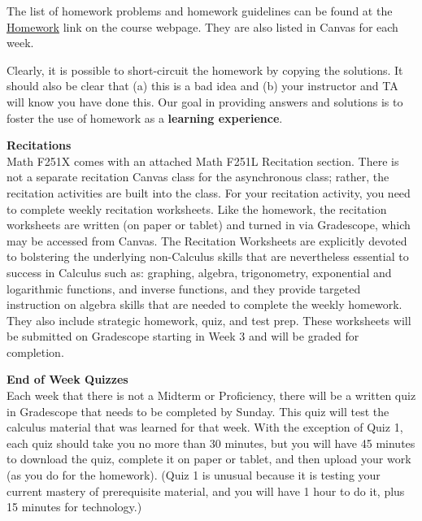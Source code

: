 \documentclass[12pt]{article}
\renewcommand{\emph}[1]{\textsf{\textbf{#1}}}
\newcommand{\localhead}[1]{\par\smallskip\textbf{#1}\nobreak\\}%
\def\heading#1{\localhead{\large\emph{#1}}}
\begin{document}
The list of homework problems and homework guidelines can be found at the \href{https://uaf-math251.github.io/writtenhomework.html}{Homework} link on the course webpage. They are also listed in Canvas for each week.

Clearly, it is possible to short-circuit the homework by copying the solutions. It should also be clear that (a) this is a bad idea and (b) your instructor and TA will know you have done this. Our goal in providing answers and solutions is to foster the use of homework as a \emph{learning experience}. 

\heading{Recitations}
%
Math F251X comes with an attached Math F251L Recitation section. There is not a separate recitation Canvas class for the asynchronous class; rather, the recitation activities are built into the class. For your recitation activity, you need to complete weekly recitation worksheets. Like the homework, the recitation worksheets are written (on paper or tablet) and turned in via Gradescope, which may be accessed from Canvas. The Recitation Worksheets are explicitly devoted to bolstering the underlying non-Calculus skills that are nevertheless essential to success in Calculus such as: graphing, algebra, trigonometry, exponential and logarithmic functions, and inverse functions, and they provide targeted instruction on algebra skills that are needed to complete the weekly homework. They also include strategic homework, quiz, and test prep. These worksheets will be submitted on Gradescope starting in Week 3 and will be graded for completion.




\heading{End of Week Quizzes}
Each week that there is not a Midterm or Proficiency, there will be a written quiz in Gradescope that needs to be completed by Sunday. This quiz will test
the calculus material that was learned for that week. With the exception of Quiz 1, each quiz should take you no more than 30 minutes, but you will have 45 minutes to download the quiz, complete it on paper or tablet, and then upload your work (as you do for the homework). (Quiz 1 is unusual because it is testing your current mastery of prerequisite material, and you will have 1 hour to do it, plus 15 minutes for technology.)
\end{document}
